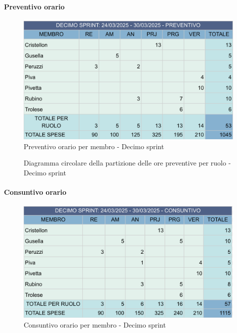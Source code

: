\documentclass[10pt]{article}
\begin{document}
{{{{{{{{{{{            \paragraph{Preventivo orario}\mbox{}\vspace{0.4em}
            \begin{figure}[H]
                \centering
                \includegraphics[width=0.6\linewidth]{preventivoOreDecimoSprint.PNG}
                \caption{Preventivo orario per membro - Decimo sprint}
                \label{fig:Preventivo orario per membro - Decimo sprint}
            \end{figure}
    
            \begin{figure}[H]
                \centering
                \caption{Diagramma circolare della partizione delle ore preventive per ruolo - Decimo sprint}
                \label{fig:Diagramma circolare della partizione delle ore preventive per ruolo - Decimo sprint}
            \end{figure}
            
            \paragraph{Consuntivo orario}\mbox{}\vspace{0.4em}
            \begin{figure}[ht]
                \centering
                \includegraphics[width=0.6\linewidth]{consuntivoOreDecimoSprint.PNG}
                \caption{Consuntivo orario per membro - Decimo sprint}
                \label{fig:Consuntivo orario per membro - Decimo sprint}
            \end{figure}
    
}}}}}}}}}}}
\end{document}
